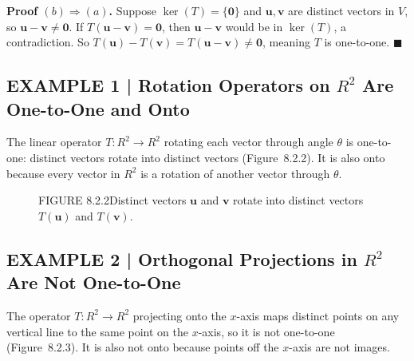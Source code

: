 \documentclass{article}
\begin{document}
\textbf{Proof $(b)\Rightarrow(a)$.} Suppose $\ker(T) = \{\mathbf{0}\}$ and $\mathbf{u},\mathbf{v}$
are distinct vectors in $V$, so $\mathbf{u}-\mathbf{v} \neq \mathbf{0}$. If $T(\mathbf{u}-\mathbf{v})
= \mathbf{0}$, then $\mathbf{u}-\mathbf{v}$ would be in $\ker(T)$, a contradiction. So
$T(\mathbf{u}) - T(\mathbf{v}) = T(\mathbf{u}-\mathbf{v}) \neq \mathbf{0}$, meaning $T$ is
one-to-one. $\blacksquare$

\subsection*{EXAMPLE 1 | Rotation Operators on $R^2$ Are One-to-One and Onto}

The linear operator $T : R^2 \to R^2$ rotating each vector through angle $\theta$ is
one-to-one: distinct vectors rotate into distinct vectors (Figure~8.2.2). It is also onto
because every vector in $R^2$ is a rotation of another vector through $\theta$.

\begin{figure}[ht]
\centering
{}
\caption*{FIGURE 8.2.2\quad Distinct vectors $\mathbf{u}$ and $\mathbf{v}$ rotate into distinct
vectors $T(\mathbf{u})$ and $T(\mathbf{v})$.}
\end{figure}

\subsection*{EXAMPLE 2 | Orthogonal Projections in $R^2$ Are Not One-to-One}

The operator $T : R^2 \to R^2$ projecting onto the $x$-axis maps distinct points on any
vertical line to the same point on the $x$-axis, so it is not one-to-one (Figure~8.2.3).
It is also not onto because points off the $x$-axis are not images.
\end{document}
